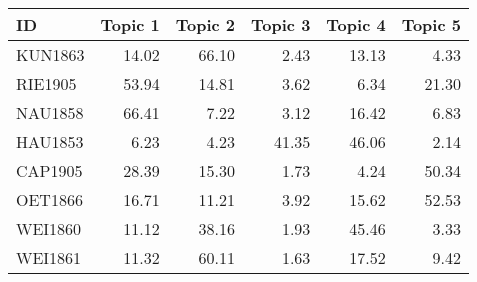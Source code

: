 \begin{tabular}{lrrrrr}
\toprule
     ID &  Topic 1 &  Topic 2 &  Topic 3 &  Topic 4 &  Topic 5 \\
\midrule
KUN1863 &    14.02 &    66.10 &     2.43 &    13.13 &     4.33 \\
RIE1905 &    53.94 &    14.81 &     3.62 &     6.34 &    21.30 \\
NAU1858 &    66.41 &     7.22 &     3.12 &    16.42 &     6.83 \\
HAU1853 &     6.23 &     4.23 &    41.35 &    46.06 &     2.14 \\
CAP1905 &    28.39 &    15.30 &     1.73 &     4.24 &    50.34 \\
OET1866 &    16.71 &    11.21 &     3.92 &    15.62 &    52.53 \\
WEI1860 &    11.12 &    38.16 &     1.93 &    45.46 &     3.33 \\
WEI1861 &    11.32 &    60.11 &     1.63 &    17.52 &     9.42 \\
\bottomrule
\end{tabular}
